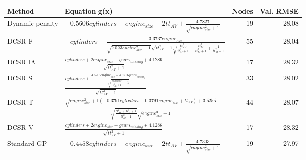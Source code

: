 \begin{tabular}{lp{9cm}rr}
\toprule
Method & Equation g(x) & Nodes & Val. RMSE \\
\midrule
Dynamic penalty & $- 0.5606 cylinders - engine_{size} + 2 tt_{AV} + \frac{4.7827}{\sqrt{engine_{size}^{2} + 1}}$ & 19 & 28.08 \\
DCSR-F & $- cylinders - \frac{3.3737 engine_{size}}{\sqrt{0.023 engine_{size}^{2} + 1} \sqrt{tt_{AV}^{2} + 1} \sqrt{\frac{tt_{AV}^{2}}{tt_{M}^{2} + 1} + \frac{tt_{M}^{2}}{tt_{M}^{2} + 1} + \frac{1}{tt_{M}^{2} + 1}}}$ & 55 & 28.04 \\
DCSR-IA & $\frac{cylinders + 2 engine_{size} - gears_{missing} + 4.1286}{\sqrt{tt_{AV}^{2} + 1}}$ & 17 & 28.32 \\
DCSR-S & $\frac{cylinders + \frac{4.5216 engine_{size} - 4.5216 gears_{missing}}{\sqrt{\frac{cylinders^{2}}{tt_{AV}^{2} + 1} + 1}}}{\sqrt{tt_{AV}^{2} + 1}}$ & 33 & 28.02 \\
DCSR-T & $\frac{\sqrt{engine_{size}^{2} + 1} \left(- 0.3791 cylinders - 0.3791 engine_{size} + tt_{AV}\right) + 3.5255}{\sqrt{\frac{tt_{AV}^{2} + tt_{M}^{2} + 1}{tt_{M}^{2} + 1}} \sqrt{engine_{size}^{2} + 1}}$ & 44 & 28.07 \\
DCSR-V & $\frac{cylinders + 2 engine_{size} - gears_{missing} + 4.1286}{\sqrt{tt_{AV}^{2} + 1}}$ & 17 & 28.32 \\
Standard GP & $- 0.4458 cylinders - engine_{size} + 2 tt_{AV} + \frac{4.7303}{\sqrt{engine_{size}^{2} + 1}}$ & 19 & 27.97 \\
\bottomrule
\end{tabular}
